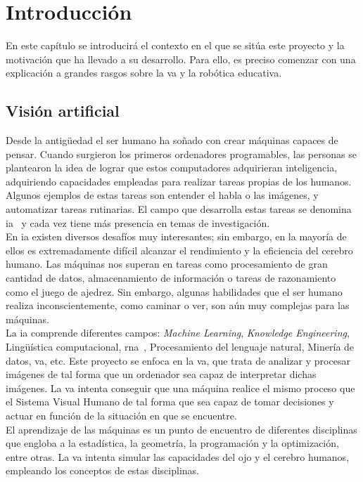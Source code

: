 \chapter{Introducción}\label{cap.introduccion}
En este capítulo se introducirá el contexto en el que se sitúa este proyecto y la motivación que ha llevado a su desarrollo. Para ello, es preciso comenzar con una
explicación a grandes rasgos sobre la \acrfull{va} y la robótica educativa.
\section{Visión artificial}

Desde la antigüedad el ser humano ha soñado con crear máquinas capaces de pensar. Cuando surgieron los primeros ordenadores programables, las personas se plantearon la idea de lograr que estos computadores adquirieran inteligencia, adquiriendo capacidades empleadas para realizar tareas propias de los humanos. Algunos ejemplos de estas tareas son entender el habla o las imágenes, y automatizar tareas rutinarias. El campo que desarrolla estas tareas se denomina \acrfull{ia}~\cite{Goodfellow} y cada vez tiene más presencia en temas de investigación.\\

En \acrshort{ia} existen diversos desafíos muy interesantes; sin embargo, en la mayoría de ellos es extremadamente difícil alcanzar el rendimiento y la eficiencia del cerebro humano. Las máquinas nos superan en tareas como procesamiento de gran cantidad de datos, almacenamiento de información o tareas de razonamiento como el juego de ajedrez. Sin embargo, algunas habilidades que el ser humano realiza inconscientemente, como caminar o ver, son aún muy complejas para las máquinas.\\

La \acrshort{ia} comprende diferentes campos: \textit{Machine Learning}, \textit{Knowledge Engineering}, Lingüística computacional, \acrfull{rna}~\cite{rna}, Procesamiento del lenguaje natural, Minería de datos, \acrfull{va}, etc. Este proyecto se enfoca en la \acrshort{va}, que trata de analizar y procesar imágenes de tal forma que un ordenador sea capaz de interpretar dichas imágenes. La \acrshort{va} intenta conseguir que una máquina realice el mismo proceso que el Sistema Visual Humano de tal forma que sea capaz de tomar decisiones y actuar en función de la situación en que se encuentre.\\

El aprendizaje de las máquinas es un punto de encuentro de diferentes disciplinas que engloba a la estadística, la geometría, la programación y la optimización, entre otras. La \acrshort{va} intenta simular las capacidades del ojo y el cerebro humanos, empleando los conceptos de estas disciplinas.\\

